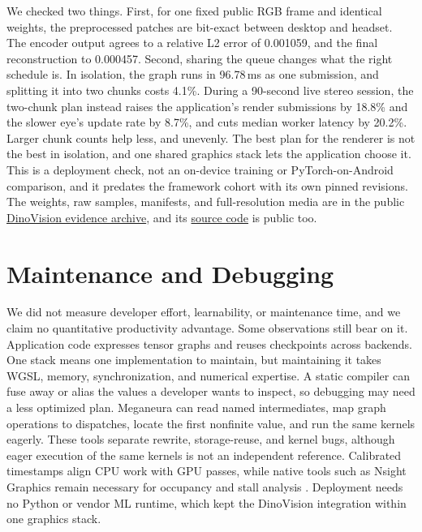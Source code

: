 \documentclass[conference]{IEEEtran}
\newcommand{\system}{Meganeura}
\begin{document}
We checked two things. First, for one fixed public RGB frame and identical
weights, the preprocessed patches are bit-exact between desktop and headset.
The encoder output agrees to a relative L2 error of 0.001059, and the final
reconstruction to 0.000457. Second, sharing the queue changes what the right
schedule is. In isolation, the graph runs in 96.78\,ms as one submission, and
splitting it into two chunks costs 4.1\%. During a 90-second live stereo
session, the two-chunk plan instead raises the application's render
submissions by 18.8\% and the slower eye's update rate by 8.7\%, and cuts
median worker latency by 20.2\%. Larger chunk counts help less, and
unevenly. The best plan for the renderer is not the best in isolation, and
one shared graphics stack lets the application choose it. This is a
deployment check, not an on-device training or PyTorch-on-Android
comparison, and it predates the framework cohort with its own pinned
revisions. The weights, raw samples, manifests, and full-resolution media
are in the public
\href{https://huggingface.co/mad-bot/dinovision/tree/2c3f9017fe74c41482b165890c14737a2ccd4b6a}{DinoVision evidence archive},
and its \href{https://github.com/kvark/dinovision/tree/dc35cdf1c7c910cdd93c5b5362846842ae469a21}{source code}
is public too.

\section{Maintenance and Debugging}
\label{sec:productivity}

We did not measure developer effort, learnability, or maintenance time, and
we claim no quantitative productivity advantage. Some observations still
bear on it. Application code expresses tensor graphs and reuses checkpoints
across backends. One stack means one implementation to maintain, but
maintaining it takes WGSL, memory, synchronization, and numerical expertise.
A static compiler can fuse away or alias the values a developer wants to
inspect, so debugging may need a less optimized plan. \system{} can read
named intermediates, map graph operations to dispatches, locate the first
nonfinite value, and run the same kernels eagerly. These tools separate
rewrite, storage-reuse, and kernel bugs, although eager execution of the same
kernels is not an independent reference. Calibrated timestamps align CPU work
with GPU passes, while native tools such as Nsight Graphics remain necessary
for occupancy and stall analysis \cite{nvidia2026gputrace}. Deployment needs
no Python or vendor ML runtime, which kept the DinoVision integration within
one graphics stack.
\end{document}
